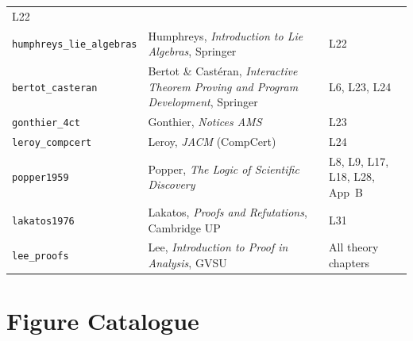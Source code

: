 \begin{longtable}{lp{4cm}p{6cm}}
  L22 \\
\texttt{humphreys\_lie\_algebras} &
  Humphreys, \emph{Introduction to Lie Algebras}, Springer
  \cite{humphreys_lie_algebras} &
  L22 \\
\texttt{bertot\_casteran} &
  Bertot \& Castéran, \emph{Interactive Theorem Proving
  and Program Development}, Springer \cite{bertot_casteran} &
  L6, L23, L24 \\
\texttt{gonthier\_4ct} &
  Gonthier, \emph{Notices AMS} \cite{gonthier_4ct} &
  L23 \\
\texttt{leroy\_compcert} &
  Leroy, \emph{JACM} (CompCert) \cite{leroy_compcert} &
  L24 \\
\texttt{popper1959} &
  Popper, \emph{The Logic of Scientific Discovery}
  \cite{popper1959} &
  L8, L9, L17, L18, L28, App~B \\
\texttt{lakatos1976} &
  Lakatos, \emph{Proofs and Refutations},
  Cambridge UP \cite{lakatos1976} &
  L31 \\
\texttt{lee\_proofs} &
  Lee, \emph{Introduction to Proof in Analysis},
  GVSU \cite{lee_proofs} &
  All theory chapters \\
\end{longtable}

\section{Figure Catalogue}
\label{sec:A-figure-catalogue}

